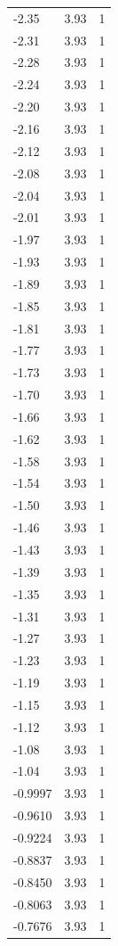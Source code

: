 \begin{longtable}{lrr}
  -2.35 & 3.93 & 1 \\
  -2.31 & 3.93 & 1 \\
  -2.28 & 3.93 & 1 \\
  -2.24 & 3.93 & 1 \\
  -2.20 & 3.93 & 1 \\
  -2.16 & 3.93 & 1 \\
  -2.12 & 3.93 & 1 \\
  -2.08 & 3.93 & 1 \\
  -2.04 & 3.93 & 1 \\
  -2.01 & 3.93 & 1 \\
  -1.97 & 3.93 & 1 \\
  -1.93 & 3.93 & 1 \\
  -1.89 & 3.93 & 1 \\
  -1.85 & 3.93 & 1 \\
  -1.81 & 3.93 & 1 \\
  -1.77 & 3.93 & 1 \\
  -1.73 & 3.93 & 1 \\
  -1.70 & 3.93 & 1 \\
  -1.66 & 3.93 & 1 \\
  -1.62 & 3.93 & 1 \\
  -1.58 & 3.93 & 1 \\
  -1.54 & 3.93 & 1 \\
  -1.50 & 3.93 & 1 \\
  -1.46 & 3.93 & 1 \\
  -1.43 & 3.93 & 1 \\
  -1.39 & 3.93 & 1 \\
  -1.35 & 3.93 & 1 \\
  -1.31 & 3.93 & 1 \\
  -1.27 & 3.93 & 1 \\
  -1.23 & 3.93 & 1 \\
  -1.19 & 3.93 & 1 \\
  -1.15 & 3.93 & 1 \\
  -1.12 & 3.93 & 1 \\
  -1.08 & 3.93 & 1 \\
  -1.04 & 3.93 & 1 \\
  -0.9997 & 3.93 & 1 \\
  -0.9610 & 3.93 & 1 \\
  -0.9224 & 3.93 & 1 \\
  -0.8837 & 3.93 & 1 \\
  -0.8450 & 3.93 & 1 \\
  -0.8063 & 3.93 & 1 \\
  -0.7676 & 3.93 & 1 \\

\end{longtable}
